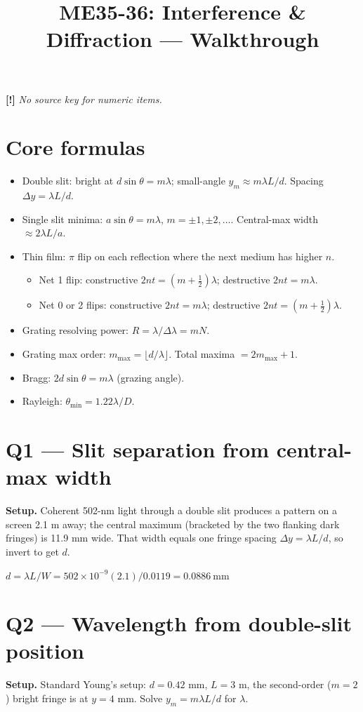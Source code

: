 \documentclass[11pt]{article}
\title{ME35-36: Interference \& Diffraction --- Walkthrough}
\author{}\date{}
\newcommand{\warn}{\textbf{[!]}}
\begin{document}
\maketitle

\warn{} \emph{No source key for numeric items.}

\section*{Core formulas}
\begin{itemize}[leftmargin=*]
\item Double slit: bright at $d\sin\theta = m\lambda$; small-angle $y_m \approx m\lambda L/d$. Spacing $\Delta y = \lambda L/d$.
\item Single slit minima: $a\sin\theta = m\lambda$, $m=\pm1,\pm2,\dots$. Central-max width $\approx 2\lambda L/a$.
\item Thin film: $\pi$ flip on each reflection where the next medium has higher $n$.
  \begin{itemize}
    \item Net 1 flip: constructive $2nt = (m+\tfrac12)\lambda$; destructive $2nt = m\lambda$.
    \item Net 0 or 2 flips: constructive $2nt = m\lambda$; destructive $2nt = (m+\tfrac12)\lambda$.
  \end{itemize}
\item Grating resolving power: $R = \lambda/\Delta\lambda = mN$.
\item Grating max order: $m_{\max}=\lfloor d/\lambda\rfloor$. Total maxima $= 2m_{\max}+1$.
\item Bragg: $2d\sin\theta = m\lambda$ (grazing angle).
\item Rayleigh: $\theta_{\min} = 1.22\lambda/D$.
\end{itemize}

\section*{Q1 --- Slit separation from central-max width}
\textbf{Setup.} Coherent 502-nm light through a double slit produces a pattern on a screen 2.1 m away; the central maximum (bracketed by the two flanking dark fringes) is 11.9 mm wide. That width equals one fringe spacing $\Delta y = \lambda L/d$, so invert to get $d$.

$d = \lambda L/W = 502\times10^{-9}(2.1)/0.0119 = \boxed{0.0886\ \text{mm}}$

\section*{Q2 --- Wavelength from double-slit position}
\textbf{Setup.} Standard Young's setup: $d=0.42$ mm, $L=3$ m, the second-order ($m=2$) bright fringe is at $y=4$ mm. Solve $y_m = m\lambda L/d$ for $\lambda$.
\end{document}
